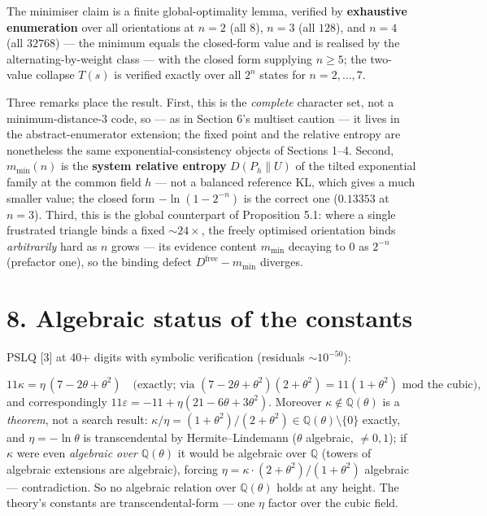 \documentclass[11pt]{article}
\begin{document}
The minimiser claim is a finite global-optimality lemma, verified by \textbf{exhaustive enumeration} over all orientations at $n=2$ (all $8$), $n=3$ (all $128$), and $n=4$ (all $32768$) — the minimum equals the closed-form value and is realised by the alternating-by-weight class — with the closed form supplying $n\ge5$; the two-value collapse $T(s)$ is verified exactly over all $2^n$ states for $n=2,\dots,7$.

Three remarks place the result.  First, this is the \emph{complete} character set, not a minimum-distance-3 code, so — as in Section 6's multiset caution — it lives in the abstract-enumerator extension; the fixed point and the relative entropy are nonetheless the same exponential-consistency objects of Sections 1–4.  Second, $m_{\min}(n)$ is the \textbf{system relative entropy} $D(P_h\|U)$ of the tilted exponential family at the common field $h$ — not a balanced reference KL, which gives a much smaller value; the closed form $-\ln(1-2^{-n})$ is the correct one ($0.13353$ at $n=3$).  Third, this is the global counterpart of Proposition 5.1: where a single frustrated triangle binds a fixed $\sim24\times$, the freely optimised orientation binds \emph{arbitrarily} hard as $n$ grows — its evidence content $m_{\min}$ decaying to $0$ as $2^{-n}$ (prefactor one), so the binding defect $D^{\mathrm{free}} - m_{\min}$ diverges.

\section*{8. Algebraic status of the constants}
PSLQ [3] at 40+ digits with symbolic verification (residuals $\sim 10^{-50}$):

\[
11\kappa = \eta\,(7 - 2\theta + \theta^2)
\quad\text{(exactly; via } (7-2\theta+\theta^2)(2+\theta^2) =
11(1+\theta^2) \text{ mod the cubic)},
\]
and correspondingly $11\varepsilon = -11 + \eta(21 - 6\theta + 3\theta^2)$.  Moreover $\kappa \notin \mathbb Q(\theta)$ is a \emph{theorem}, not a search result: $\kappa/\eta = (1+\theta^2)/ (2+\theta^2) \in \mathbb Q(\theta)\setminus\{0\}$ exactly, and $\eta = -\ln\theta$ is transcendental by Hermite–Lindemann ($\theta$ algebraic, $\neq 0, 1$); if $\kappa$ were even \emph{algebraic over} $\mathbb Q(\theta)$ it would be algebraic over $\mathbb Q$ (towers of algebraic extensions are algebraic), forcing $\eta = \kappa\cdot(2+\theta^2)/(1+\theta^2)$ algebraic — contradiction.  So no algebraic relation over $\mathbb Q(\theta)$ holds at any height.  The theory's constants are transcendental-form — one $\eta$ factor over the cubic field.
\end{document}
